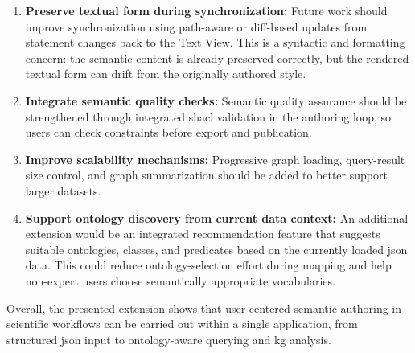 \begin{enumerate}
  \item \textbf{Preserve textual form during synchronization:} Future work should improve synchronization using path-aware or diff-based updates from statement changes back to the Text View. This is a syntactic and formatting concern: the semantic content is already preserved correctly, but the rendered textual form can drift from the originally authored style.

  \item \textbf{Integrate semantic quality checks:} Semantic quality assurance should be strengthened through integrated \gls{shacl} validation in the authoring loop, so users can check constraints before export and publication.

  \item \textbf{Improve scalability mechanisms:} Progressive graph loading, query-result size control, and graph summarization should be added to better support larger datasets.

  \item \textbf{Support ontology discovery from current data context:} An additional extension would be an integrated recommendation feature that suggests suitable ontologies, classes, and predicates based on the currently loaded \gls{json} data. This could reduce ontology-selection effort during mapping and help non-expert users choose semantically appropriate vocabularies.

\end{enumerate}

Overall, the presented extension shows that user-centered semantic authoring in scientific workflows can be carried out within a single application, from structured \gls{json} input to ontology-aware querying and \gls{kg} analysis.
